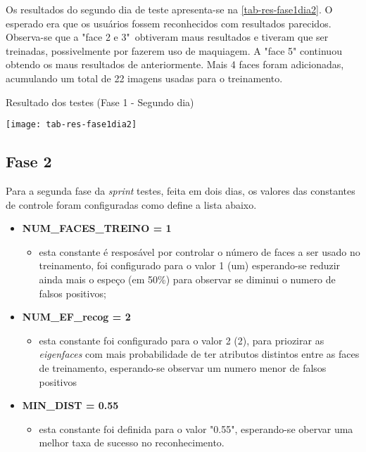 Os resultados do segundo dia de teste apresenta-se na \autoref{tab-res-fase1dia2}. O esperado era que os usuários fossem reconhecidos com resultados parecidos. Observa-se que a "face 2 e 3"\ obtiveram maus resultados e tiveram que ser treinadas, possivelmente por fazerem uso de maquiagem. A "face 5" continuou obtendo os maus resultados de anteriormente. Mais 4 faces foram adicionadas, acumulando um total de 22 imagens usadas para o treinamento.

\begin{table}[h]
	\centering
	\caption{Resultado dos testes (Fase 1 - Segundo dia) }
	\texttt{[image: tab-res-fase1dia2]}
	\label{tab-res-fase1dia2}
\end{table}



\subsection{Fase 2}\label{ch:testresultfaz2}
Para a segunda fase da \textit{sprint} testes, feita em dois dias, os valores das constantes de controle foram configuradas como define a lista abaixo.

\begin{itemize}	
	\item \textbf{NUM\_FACES\_TREINO = 1}
	\begin{itemize}	
		\item esta constante é resposável por controlar o número de faces a ser usado no treinamento, foi configurado para o valor 1 (um) esperando-se reduzir ainda mais o espeço (em 50\%) para observar se diminui o numero de falsos positivos;
	\end{itemize}
	
	\item \textbf{NUM\_EF\_recog = 2}
	\begin{itemize}	
		\item esta constante foi configurado para o valor 2 (2), para priozirar as \textit{eigenfaces} com mais probabilidade de ter atributos distintos entre as faces de treinamento, esperando-se observar um numero menor de falsos positivos
	\end{itemize}
	
	\item \textbf{MIN\_DIST = 0.55}
	\begin{itemize}	
		\item esta constante foi definida para o valor "0.55", esperando-se obervar uma melhor taxa de sucesso no reconhecimento.
	\end{itemize}
\end{itemize}

